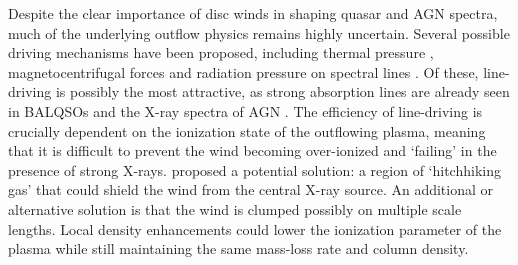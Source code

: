 \documentclass[useAMS,usenatbib]{mn2e_x}
\begin{document}
Despite the clear importance of disc winds in shaping quasar and AGN spectra,  
much of the underlying outflow physics remains highly uncertain. 
Several possible driving mechanisms have been proposed, including
thermal pressure \citep{weymann1982, begelman1991}, magnetocentrifugal forces 
\citep{blandfordpayne,pelletier_pudritz} and 
radiation pressure on spectral lines \citep[`line-driving';][]{lucysolomon1970,shlosman1985,MCGV95}.
Of these, line-driving is possibly the most attractive, as
strong absorption lines are already seen in BALQSOs and the X-ray spectra of AGN 
\citep{reeves2003,poundsreeves2009,tombesi2010a}.
The efficiency of line-driving is crucially dependent on the ionization state 
of the outflowing plasma, meaning that it is difficult to prevent 
the wind becoming over-ionized and `failing' in the presence of strong X-rays. 
\cite{MCGV95} proposed a potential solution: 
a region of `hitchhiking gas' that could shield the wind from the central X-ray source. 
An additional or alternative solution is that the wind is clumped \citep[e.g.][]{hamann2013}
possibly on multiple scale lengths. Local density enhancements could lower the 
ionization parameter of the plasma while still maintaining the same mass-loss 
rate and column density. 
\end{document}
